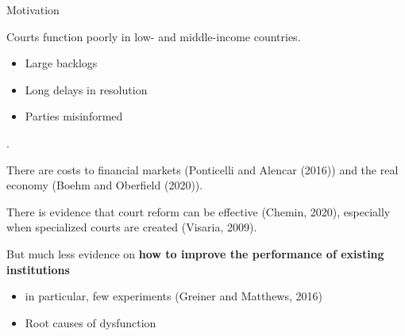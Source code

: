 \documentclass[9pt]{beamer}
\begin{document}
\begin{frame}{Motivation}{}

  Courts function poorly in low- and middle-income countries.
  \begin{itemize}
      \item Large backlogs
      \item Long delays in resolution
      \item Parties misinformed
  \end{itemize}. 
  
  \vspace{2mm}
  \noindent There are costs to financial markets (Ponticelli and Alencar (2016)) and the real economy (Boehm and Oberfield (2020)). 
  
  \pause
  \vspace{4mm}
  There is  evidence that court reform can be effective (Chemin, 2020), especially when specialized courts are created (Visaria, 2009). 
  
  \vspace{4mm}
  But much less evidence
on \textbf{how to improve the performance of existing institutions}
\begin{itemize}
    \item in particular, few experiments (Greiner and Matthews, 2016)
    \item Root causes of dysfunction
\end{itemize}
  \end{frame}
  
\end{document}
